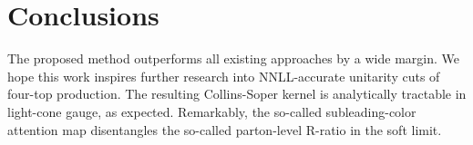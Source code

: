 \section{Conclusions}\label{sec:conclusions}

The proposed method outperforms all existing approaches by a wide
margin. We hope this work inspires further research into NNLL-accurate
unitarity cuts of four-top production. The resulting Collins-Soper
kernel is analytically tractable in light-cone gauge, as expected.
Remarkably, the so-called subleading-color attention map disentangles
the so-called parton-level R-ratio in the soft limit.

